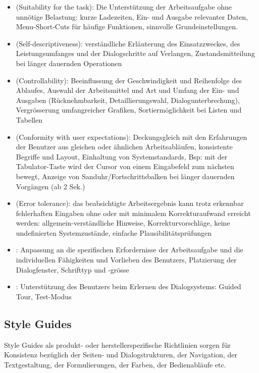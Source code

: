 \begin{itemize}
\item {} (Suitability for the task): Die
  Unterstützung der Arbeitsaufgabe ohne unnötige Belastung: kurze Ladezeiten,
  Ein- und Ausgabe relevanter Daten, Menu-Short-Cuts für häufige Funktionen,
  sinnvolle Grundeinstellungen.
\ifslides
\newpage
\fi
\item {} (Self-descriptiveness):
  verständliche Erläuterung des
  Einsatzzweckes, des Leistungsumfanges und der Dialogschritte auf
  Verlangen, Zustandsmitteilung bei länger dauernden Operationen
\ifslides
\newpage
\fi
\item {} (Controllability): Beeinflussung der
  Geschwindigkeit und Reihenfolge des Ablaufes, Auswahl der Arbeitsmittel und
  Art und Umfang der Ein- und Ausgaben (Rück\-nehm\-bar\-keit,
  Detaillierungswahl, Dialogunterbrechung), Vergrösserung umfangreicher
  Gra\-fiken, Sortiermöglichkeit bei Listen und Tabellen
\ifslides
\newpage
\fi
\item {} (Conformity with user
  expectations): Deckungsgleich mit den Erfahrungen der Benutzer aus gleichen
  oder ähnlichen Arbeitsabläufen, konsistente Begriffe und Layout, Einhaltung
  von Systemstandards, Bsp: mit der Tabulator-Taste wird der Cursor von einem
  Eingabefeld zum nächsten bewegt, Anzeige von Sanduhr/Fortschrittsbalken bei
  länger dauernden Vorgängen (ab 2 Sek.)
\ifslides
\newpage
\fi
\item {} (Error tolerance): das beabsichtigte
  Arbeitsergebnis kann trotz erkennbar fehlerhaften Eingaben ohne oder mit
  minimalem Korrekturaufwand erreicht werden: all\-ge\-mein-verständliche
  Hinweise,  Korrekturvorschläge, keine undefinierten System\-zu\-stände,
  einfache Plausibilitätsprüfungen
\ifslides
\newpage
\fi
\item {}: Anpassung an die spezifischen
  Erfordernisse der Arbeitsaufgabe und die individuellen Fähigkeiten und
  Vorlieben des Benutzers, Platzierung der Dialogfenster, Schrifttyp und
  -grösse
\ifslides
\newpage
\fi
\item {}: Unterstützung des Benutzers beim
  Erlernen des Dialogsystems: Guided Tour, Test-Modus
\end{itemize}
\ifslides
\newpage
\fi
\subsection{Style Guides}
Style Guides als produkt- oder herstellerspezifische
Richtlinien sorgen für
Konsistenz bezüglich der Seiten- und Dialogstrukturen, der Navigation, der
Textgestaltung, der Formulierungen, der Farben, der Bedienabläufe etc.\\

